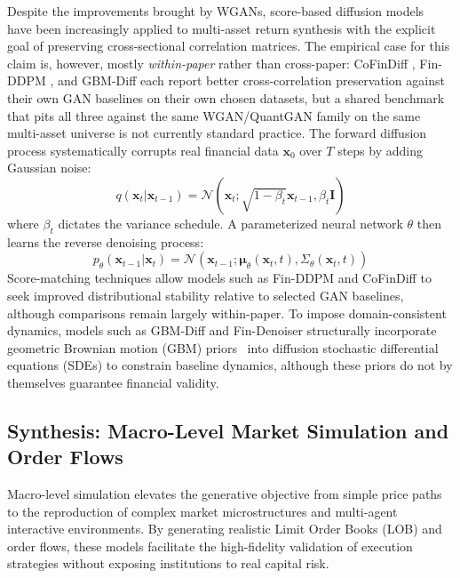 Despite the improvements brought by WGANs, score-based diffusion models~\citep{song2019generative,song2021score} have been increasingly applied to multi-asset return synthesis with the explicit goal of preserving cross-sectional correlation matrices. The empirical case for this claim is, however, mostly \emph{within-paper} rather than cross-paper: CoFinDiff \citep{tanaka2025cofindiff}, Fin-DDPM \citep{takahashi2024generation}, and GBM-Diff \citep{kim2025gbm} each report better cross-correlation preservation against their own GAN baselines on their own chosen datasets, but a shared benchmark that pits all three against the same WGAN/QuantGAN family on the same multi-asset universe is not currently standard practice. The forward diffusion process systematically corrupts real financial data $\mathbf{x}_0$ over $T$ steps by adding Gaussian noise:
\begin{equation}
q(\mathbf{x}_t | \mathbf{x}_{t-1}) = \mathcal{N}(\mathbf{x}_t; \sqrt{1 - \beta_t}\mathbf{x}_{t-1}, \beta_t \mathbf{I})
\end{equation}
where $\beta_t$ dictates the variance schedule. A parameterized neural network $\theta$ then learns the reverse denoising process:
\begin{equation}
p_\theta(\mathbf{x}_{t-1} | \mathbf{x}_t) = \mathcal{N}(\mathbf{x}_{t-1}; \boldsymbol{\mu}_\theta(\mathbf{x}_t, t), \Sigma_\theta(\mathbf{x}_t, t))
\end{equation}
Score-matching techniques allow models such as Fin-DDPM and CoFinDiff \citep{takahashi2024generation, tanaka2025cofindiff} to seek improved distributional stability relative to selected GAN baselines, although comparisons remain largely within-paper. To impose domain-consistent dynamics, models such as GBM-Diff and Fin-Denoiser \citep{kim2025gbm, wang2024denoiser} structurally incorporate geometric Brownian motion (GBM) priors~\citep{black1973pricing} into diffusion stochastic differential equations (SDEs) to constrain baseline dynamics, although these priors do not by themselves guarantee financial validity.

\subsection{Synthesis: Macro-Level Market Simulation and Order Flows}

Macro-level simulation elevates the generative objective from simple price paths to the reproduction of complex market microstructures and multi-agent interactive environments. By generating realistic Limit Order Books (LOB) and order flows, these models facilitate the high-fidelity validation of execution strategies without exposing institutions to real capital risk.

